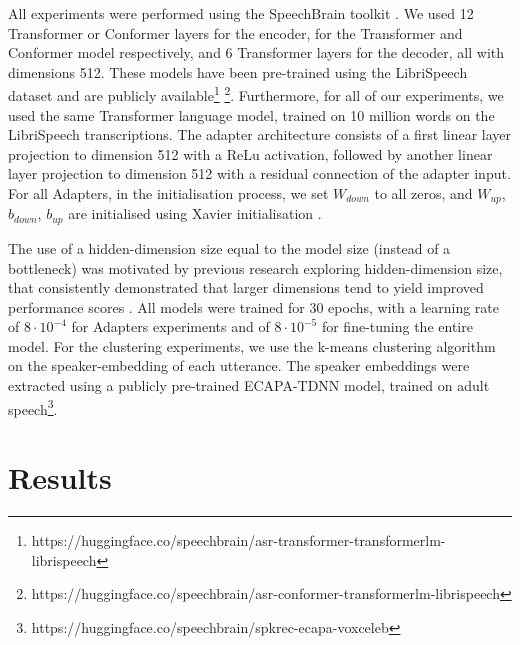 All experiments were performed using the SpeechBrain toolkit \cite{speechbrain}. We used  12 Transformer or Conformer layers for the encoder, for the Transformer and Conformer model respectively, and 6 Transformer layers for the decoder, all with dimensions 512. These models have been pre-trained using the LibriSpeech dataset \cite{librispeech} and are publicly available\footnote{https://huggingface.co/speechbrain/asr-transformer-transformerlm-librispeech} \footnote{https://huggingface.co/speechbrain/asr-conformer-transformerlm-librispeech}. Furthermore, for all of our experiments, we used the same Transformer language model, trained on 10 million words 
on the LibriSpeech transcriptions.
The adapter architecture consists of a  first linear layer projection to dimension 512 with a ReLu activation, followed by another linear layer projection to dimension 512 with a residual connection of the adapter input. For all Adapters, in the initialisation process, we set $W_{down}$ to all zeros, and $W_{up}$, $b_{down}$, $b_{up}$ are initialised using Xavier initialisation \cite{glorot2010understanding}.


The use of a hidden-dimension size equal to the model size (instead of a bottleneck) was motivated by previous research exploring hidden-dimension size, that consistently demonstrated that larger dimensions tend to yield improved performance scores \cite{chen2023efficient}.
All models were trained for 30 epochs, with a learning rate of $8\cdot10^{-4}$ for Adapters experiments and of $8\cdot10^{-5}$ for fine-tuning the entire model.
For the clustering experiments, we use the k-means clustering algorithm on the speaker-embedding of each utterance. The speaker embeddings were extracted using a publicly pre-trained ECAPA-TDNN model, trained on adult speech\footnote{https://huggingface.co/speechbrain/spkrec-ecapa-voxceleb}.

\section{Results}
\label{sec:results}

